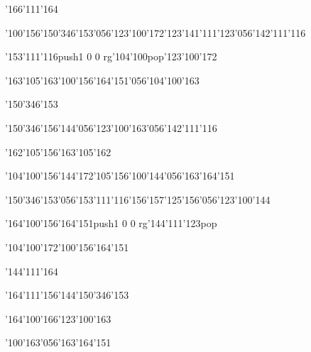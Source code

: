 \null\vfill\ipa\centerline{\enskip\char'166\char'111\char'164\enskip\enskip\enskip\enskip\enskip\enskip\enskip}\medskip\centerline{\enskip\char'100\char'156\enskip\enskip\enskip\char'150\char'346\char'153\char'056\char'123\char'100\char'172\enskip\char'123\char'141\char'111\char'123\char'056\char'142\char'111\char'116}\medskip\centerline{\enskip\char'153\char'111\char'116\enskip\enskip\enskip\enskip\enskip\enskip\enskip\pdfcolorstack\match push{1 0 0 rg}\char'104\char'100\pdfcolorstack\match pop{}\enskip\char'123\char'100\char'172}\medskip\centerline{\enskip\char'163\char'105\char'163\enskip\enskip\enskip\enskip\enskip\char'100\char'156\enskip\char'164\char'151\char'056\char'104\char'100\char'163}\medskip\centerline{\enskip\enskip\enskip\enskip\enskip\enskip\enskip\enskip\enskip\enskip\enskip\char'150\char'346\char'153}\medskip\centerline{\enskip\enskip\enskip\enskip\enskip\char'150\char'346\char'156\char'144\char'056\char'123\char'100\char'163\char'056\char'142\char'111\char'116}\medskip\centerline{\enskip\enskip\enskip\enskip\enskip\enskip\enskip\char'162\char'105\char'156\enskip\char'163\char'105\char'162}\medskip\centerline{\enskip\enskip\enskip\enskip\enskip\char'104\char'100\char'156\char'144\char'172\enskip\char'105\char'156\enskip\char'100\char'144\char'056\char'163\char'164\char'151}\medskip\vfill\footline{\hfil\tt\folio\hfil}\eject
\null\vfill\ipa\centerline{\enskip\enskip\enskip\enskip\enskip\enskip\enskip\enskip\enskip\enskip}\medskip\centerline{\enskip\enskip\enskip\enskip\enskip\enskip\char'150\char'346\char'153\char'056\char'153\char'111\char'116\enskip\char'156\char'157\char'125\char'156\char'056\char'123\char'100\char'144}\medskip\centerline{\enskip\char'164\char'100\char'156\enskip\enskip\enskip\enskip\enskip\enskip\enskip\char'164\char'151\enskip\pdfcolorstack\match push{1 0 0 rg}\char'144\char'111\char'123\pdfcolorstack\match pop{}}\medskip\centerline{\enskip\enskip\enskip\enskip\char'104\char'100\char'172\enskip\char'100\char'156\enskip\char'164\char'151\enskip\enskip\enskip\enskip}\medskip\centerline{\enskip\enskip\enskip\enskip\enskip\enskip\enskip\char'144\char'111\char'164\enskip\enskip\enskip\enskip}\medskip\centerline{\enskip\enskip\enskip\enskip\enskip\char'164\char'111\char'156\char'144\enskip\enskip\enskip\enskip\char'150\char'346\char'153}\medskip\centerline{\enskip\enskip\enskip\enskip\enskip\enskip\enskip\char'164\char'100\char'166\enskip\char'123\char'100\char'163}\medskip\centerline{\enskip\enskip\enskip\enskip\enskip\enskip\enskip\enskip\enskip\enskip\enskip\enskip\enskip\enskip\char'100\char'163\char'056\char'163\char'164\char'151}\medskip\vfill\footline{\hfil\tt\folio\hfil}\eject
